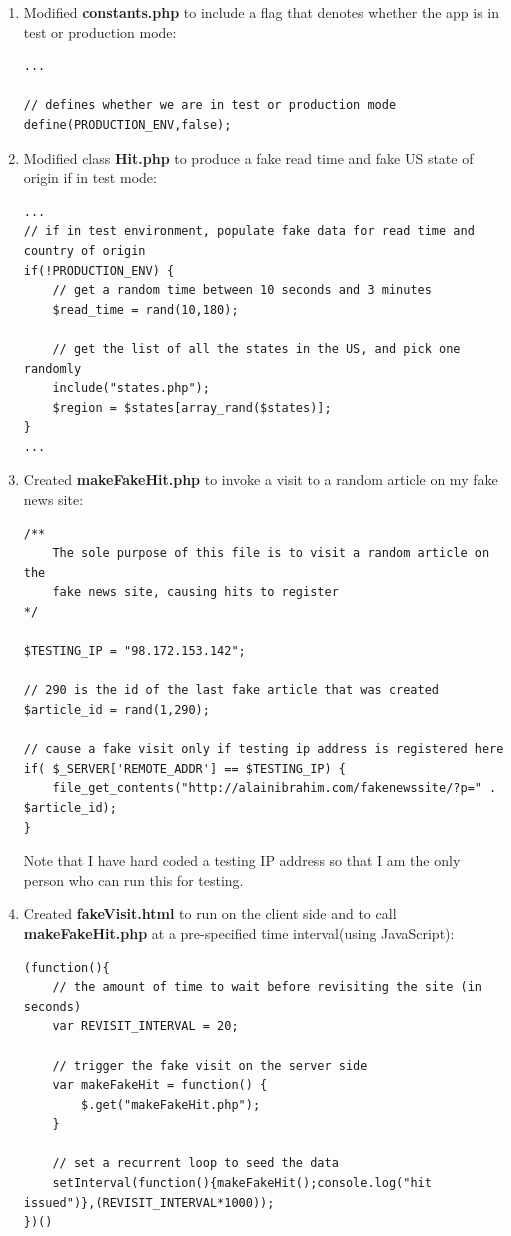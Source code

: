 \documentclass[12pt]{article}
\begin{document}
\begin{enumerate}
\item{Modified \textbf{constants.php} to include a flag that denotes whether the app is in test or production mode:}
\begin{lstlisting}[basicstyle=\scriptsize]
...

// defines whether we are in test or production mode
define(PRODUCTION_ENV,false);
\end{lstlisting}

\item{Modified class \textbf{Hit.php} to produce a fake read time and fake US state of origin if in test mode:}
\begin{lstlisting}[basicstyle=\scriptsize]
...
// if in test environment, populate fake data for read time and country of origin
if(!PRODUCTION_ENV) {
	// get a random time between 10 seconds and 3 minutes
	$read_time = rand(10,180);
	
	// get the list of all the states in the US, and pick one randomly
	include("states.php");
	$region = $states[array_rand($states)];
}
...
\end{lstlisting} 
\item{Created \textbf{makeFakeHit.php} to invoke a visit to a random article on my fake news site:}
\begin{lstlisting}[basicstyle=\scriptsize]
/**
	The sole purpose of this file is to visit a random article on the 
	fake news site, causing hits to register
*/

$TESTING_IP = "98.172.153.142";

// 290 is the id of the last fake article that was created
$article_id = rand(1,290);

// cause a fake visit only if testing ip address is registered here
if( $_SERVER['REMOTE_ADDR'] == $TESTING_IP) {
	file_get_contents("http://alainibrahim.com/fakenewssite/?p=" . $article_id);
}
\end{lstlisting}
Note that I have hard coded a testing IP address so that I am the only person who can run this for testing. \\
\item{Created \textbf{fakeVisit.html} to run on the client side and to call \textbf{makeFakeHit.php} at a pre-specified time interval(using JavaScript):}
\begin{lstlisting}[basicstyle=\scriptsize]
(function(){
	// the amount of time to wait before revisiting the site (in seconds)
	var REVISIT_INTERVAL = 20;

	// trigger the fake visit on the server side
	var makeFakeHit = function() {
		$.get("makeFakeHit.php");
	}
	
	// set a recurrent loop to seed the data
	setInterval(function(){makeFakeHit();console.log("hit issued")},(REVISIT_INTERVAL*1000));
})()
\end{lstlisting}
\end{enumerate}
\end{document}
